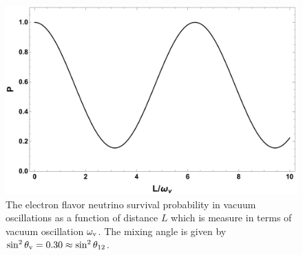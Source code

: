 \begin{figure}
    \centering
    \includegraphics[width=\textwidth]{chapters/assets/basics/neutrino-vaccum-osc-2-flavor.pdf}
    \caption{The electron flavor neutrino survival probability in vacuum oscillations as a function of distance $L$ which is measure in terms of vacuum oscillation $\omega_\mathrm v$. The mixing angle is given by $\sin^2\theta_\mathrm v=0.30 \approx \sin^2 \theta_{12}$.}
    \label{chap:basics-section:neutrinos-fig:vacuum-2-flavor-osc}
\end{figure}



